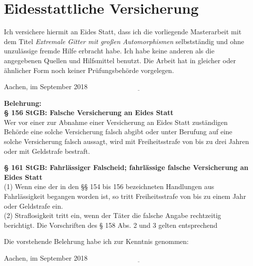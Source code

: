 \documentclass[12pt,a4paper,halfparskip,headsepline,bibtotocnumbered]{scrreprt}
\theoremstyle{nummermitklammern}
\theoremstyle{nonumberbreak}
\begin{document}
\newpage
\section{Eidesstattliche Versicherung}
Ich versichere hiermit an Eides Statt, dass ich die vorliegende Masterarbeit mit dem Titel
\textit{Extremale Gitter mit großen Automorphismen} selbstständig und ohne unzulässige fremde Hilfe erbracht habe.
Ich habe keine anderen als die angegebenen Quellen und Hilfsmittel benutzt. Die Arbeit hat in gleicher oder
ähnlicher Form noch keiner Prüfungsbehörde vorgelegen.\par
\vspace{0.5cm}
Aachen, im September 2018 \hfill $\underline{\hspace{6cm}}$\par
\vspace{2cm}
\begin{small}
\textbf{Belehrung:}\\
\textbf{§ 156 StGB: Falsche Versicherung an Eides Statt}\\
Wer vor einer zur Abnahme einer Versicherung an Eides Statt zuständigen Behörde eine solche Versicherung
falsch abgibt oder unter Berufung auf eine solche Versicherung falsch aussagt, wird mit Freiheitsstrafe
von bis zu drei Jahren oder mit Geldstrafe bestraft.\par
\textbf{§ 161 StGB: Fahrlässiger Falscheid; fahrlässige falsche Versicherung an Eides Statt}\\
(1) Wenn eine der in den §§ 154 bis 156 bezeichneten Handlungen aus Fahrlässigkeit begangen worden ist, so
tritt Freiheitsstrafe von bis zu einem Jahr oder Geldstrafe ein.\\
(2) Straflosigkeit tritt ein, wenn der Täter die falsche Angabe rechtzeitig berichtigt. Die
Vorschriften des § 158 Abs. 2 und 3 gelten entsprechend\par
\end{small}
Die vorstehende Belehrung habe ich zur Kenntnis genommen:\par
\vspace{0.5cm}
Aachen, im September 2018 \hfill $\underline{\hspace{6cm}}$\\

\newpage

\end{document}
